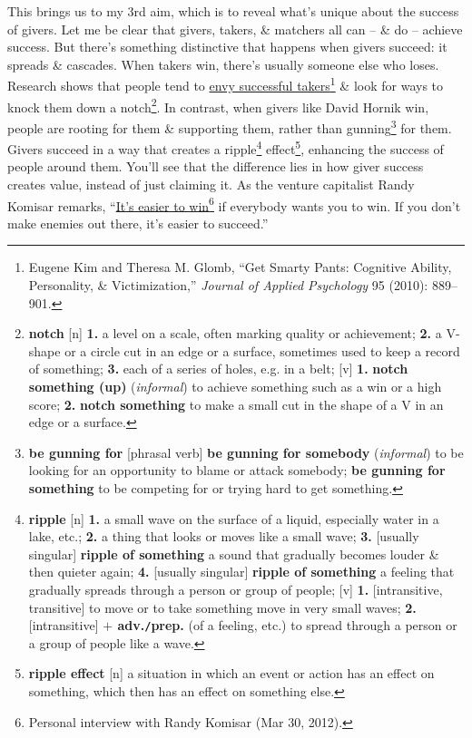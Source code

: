 \documentclass[oneside]{book}
\numberwithin{equation}{section}
\begin{document}
This brings us to my 3rd aim, which is to reveal what's unique about the success of givers. Let me be clear that givers, takers, \& matchers all can -- \& do -- achieve success. But there's something distinctive that happens when givers succeed: it spreads \& cascades. When takers win, there's usually someone else who loses. Research shows that people tend to \underline{envy successful takers}\footnote{Eugene Kim and Theresa M. Glomb, ``Get Smarty Pants: Cognitive Ability, Personality, \& Victimization,'' \textit{Journal of Applied Psychology} 95 (2010): 889--901.} \& look for ways to knock them down a notch\footnote{\textbf{notch} [n] \textbf{1.} a level on a scale, often marking quality or achievement; \textbf{2.} a V-shape or a circle cut in an edge or a surface, sometimes used to keep a record of something; \textbf{3.} each of a series of holes, e.g. in a belt; [v] \textbf{1.} \textbf{notch something (up)} (\textit{informal}) to achieve something such as a win or a high score; \textbf{2.} \textbf{notch something} to make a small cut in the shape of a V in an edge or a surface.}. In contrast, when givers like David Hornik win, people are rooting for them \& supporting them, rather than gunning\footnote{\textbf{be gunning for} [phrasal verb] \textbf{be gunning for somebody} (\textit{informal}) to be looking for an opportunity to blame or attack somebody; \textbf{be gunning for something} to be competing for or trying hard to get something.} for them. Givers succeed in a way that creates a ripple\footnote{\textbf{ripple} [n] \textbf{1.} a small wave on the surface of a liquid, especially water in a lake, etc.; \textbf{2.} a thing that looks or moves like a small wave; \textbf{3.} [usually singular] \textbf{ripple of something} a sound that gradually becomes louder \& then quieter again; \textbf{4.} [usually singular] \textbf{ripple of something} a feeling that gradually spreads through a person or group of people; [v] \textbf{1.} [intransitive, transitive] to move or to take something move in very small waves; \textbf{2.} [intransitive] \textbf{$+$ adv.\texttt{/}prep.} (of a feeling, etc.) to spread through a person or a group of people like a wave.} effect\footnote{\textbf{ripple effect} [n] a situation in which an event or action has an effect on something, which then has an effect on something else.}, enhancing the success of people around them. You'll see that the difference lies in how giver success creates value, instead of just claiming it. As the venture capitalist Randy Komisar remarks, ``\underline{It's easier to win}\footnote{Personal interview with Randy Komisar (Mar 30, 2012).} if everybody wants you to win. If you don't make enemies out there, it's easier to succeed.''
\end{document}

